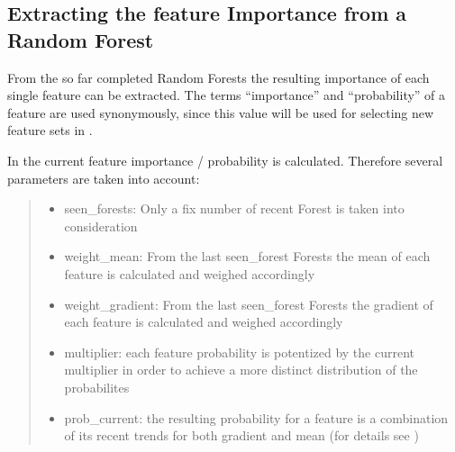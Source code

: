 \documentclass[letterpaper,10pt,english]{sphinxmanual}
\begin{document}
\subsection{Extracting the feature Importance from a Random Forest}
\label{\detokenize{RF:extracting-the-feature-importance-from-a-random-forest}}
From the so far completed Random Forests the resulting importance of each single feature can be extracted.
The terms ``importance'' and ``probability'' of a feature are used synonymously, since this value will be used for selecting new feature sets in {\hyperref[\detokenize{RF:pred-new}]{}}.

In {\hyperref[\detokenize{RF:update-prob}]{}} the current feature importance / probability is calculated.
Therefore several parameters are taken into account:
\begin{quote}
\begin{itemize}
\item {} 
seen\_forests: Only a fix number of recent Forest is taken into consideration

\item {} 
weight\_mean: From the last seen\_forest Forests the mean of each feature is calculated and weighed accordingly

\item {} 
weight\_gradient: From the last seen\_forest Forests the gradient of each feature is calculated and weighed accordingly

\end{itemize}
\label{\detokenize{RF:multi}}\begin{itemize}
\item {} 
multiplier: each feature probability is potentized by the current multiplier in order to achieve a more distinct distribution of the probabilites

\item {} 
prob\_current: the resulting probability for a feature is a combination of its recent trends for both gradient and mean (for details see {\hyperref[\detokenize{RF:update-prob}]{}})

\end{itemize}
\end{quote}
\end{document}
